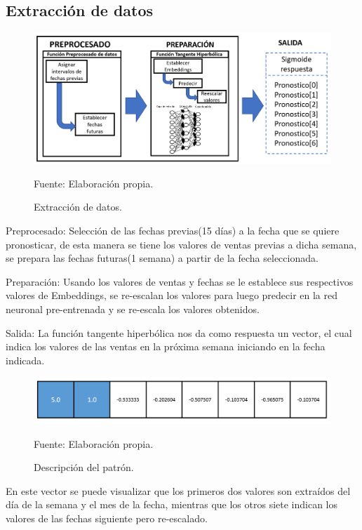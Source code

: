 \subsection{Extracción de datos}
\begin{figure}[h!]
	\centering
		\includegraphics[scale=0.4]{imagenes/extracciondatos.png}
		\caption{Extracción de datos.}
	\begin{center}
    Fuente: Elaboración propia.
    \end{center}
	\label{fig:extracciondedatos}
\end{figure}

Preprocesado:
Selección de las fechas previas(15 días) a la fecha que se quiere pronosticar, de esta manera se tiene los valores de ventas previas a dicha semana, se prepara las fechas futuras(1 semana) a partir de la fecha seleccionada.

Preparación:
Usando los valores de ventas y fechas se le establece sus respectivos valores de Embeddings, se re-escalan los valores para luego predecir en la red neuronal pre-entrenada y se re-escala los valores obtenidos.

Salida:
La función tangente hiperbólica nos da como respuesta un vector, el cual indica los valores de las ventas en la próxima semana iniciando en la fecha indicada.

\begin{figure}[h!]
	\centering
		\includegraphics[scale=0.4]{imagenes/vectorcaracteristico.png}
		\caption{Descripción del patrón.}
	\begin{center}
    Fuente: Elaboración propia.
    \end{center}
	\label{fig:DescriPatron}
\end{figure}
En este vector se puede visualizar que los primeros dos valores son extraídos del día de la semana y el mes de la fecha, mientras que los otros siete indican los valores de las fechas siguiente pero re-escalado.
